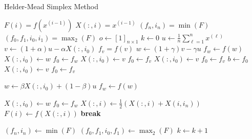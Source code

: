 \documentclass[letterpaper]{article}
\begin{document}
\begin{algorithm}[H]
    \caption{Helder-Mead Simplex Method}
    \begin{algorithmic}[1]
             
                \State $F(i) = f(x^{(i - 1)})$ 
                \State $X(:, i) = x^{(i - 1)}$ 
            \EndFor 
            \State $(f_n, i_n) = \min(F)$ %
            \State $(f_0, f_1, i_0, i_1) = \max_{2}(F)$ %
            \State $o \gets [1]_{n \times 1}$ 
            \State $k \gets 0$
                \State $u \gets \frac{1}{n}\sum_{\ell = 1}^{n} x^{(\ell)}$
                \State $v \gets (1 + \alpha) u - \alpha X(:, i_0)$
                \State $f_v = f(v)$
                    \State $w \gets (1 + \gamma) v - \gamma u$
                    \State $f_w \gets f(w)$
                        \State $X(:, i_0) \gets w$
                        \State $f_0 \gets f_w$
                    \Else 
                        \State $X(:, i_0) \gets v$
                        \State $f_0 \gets f_v$
                    \EndIf    
                \Else 
                        \State $X(:, i_0) \gets v$
                        \State $f_0 \gets f_v$
                    \Else 
                        \State $b \gets f_0$
                            \State $X(:, i_0) \gets v$
                            \State $f_0 \gets f_v$
                        \EndIf 

                        \State $w \gets \beta X(:, i_0) + (1 - \beta) u$
                        \State $f_w \gets f(w)$

                            \State $X(:, i_0) \gets w$
                            \State $f_0 \gets f_w$
                        \Else 
                                    \State $X(:, i) \gets \frac{1}{2} (X(:, i) + X(i, i_n))$
                                    \State $F(i) \gets f(X(:, i))$
                                    \State \textbf{break}
                                \EndIf 
                            \EndFor 
                        \EndIf 
                    \EndIf 
                \EndIf 

                \State $(f_n, i_n) \gets \min(F)$
                \State $(f_0, f_1, i_0, f_1) \gets \max_{2}(F)$
                \State $k \gets k + 1$
            \EndWhile 
        \EndFunction 
    \end{algorithmic}
\end{algorithm}
\end{document}
